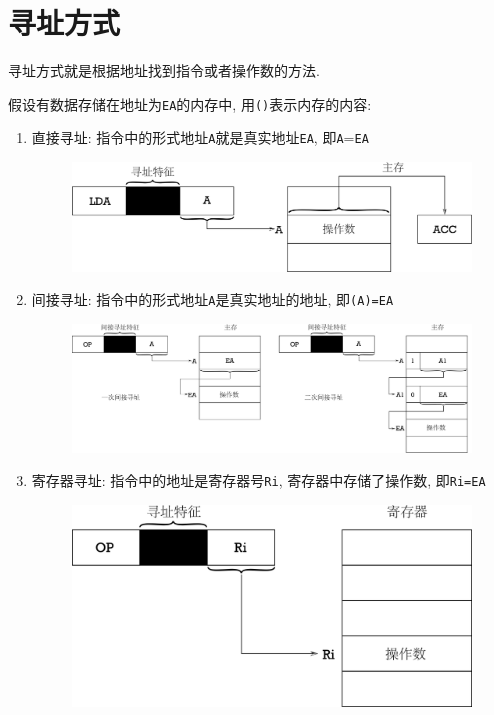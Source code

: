 \section{寻址方式}
寻址方式就是根据地址找到指令或者操作数的方法. \par 假设有数据存储在地址为\verb|EA|的内存中, 用\verb|()|表示内存的内容:
\begin{enumerate}
\item 直接寻址: 指令中的形式地址\verb|A|就是真实地址\verb|EA|, 即\verb|A|=\verb|EA|
\begin{figure}[H]
\centering
\includegraphics[scale=.4]{img/figure3.pdf}
\end{figure}
\item 间接寻址: 指令中的形式地址\verb|A|是真实地址的地址, 即\verb|(A)=EA|
\begin{figure}[H]
\centering
\includegraphics[scale=.4]{img/figure4.pdf}
\end{figure}
\item 寄存器寻址: 指令中的地址是寄存器号\verb|Ri|, 寄存器中存储了操作数, 即\verb|Ri=EA|
\begin{figure}[H]
\centering
\includegraphics[scale=.4]{img/figure5.pdf}

\end{figure}
\end{enumerate}
